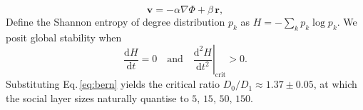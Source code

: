 \begin{equation}
\mathbf{v} = -\alpha \nabla \Phi + \beta\,\mathbf{r},
\label{eq:bern}
\end{equation}
Define the Shannon entropy of degree distribution $p_{k}$ as
$H = -\sum_{k} p_{k}\log p_{k}$.
We posit global stability when
\begin{equation}
\frac{\mathrm{d}H}{\mathrm{d}t}=0
\quad\text{and}\quad
\left.\frac{\mathrm{d}^{2}H}{\mathrm{d}t^{2}}\right|_{\mathrm{crit}}>0 .
\end{equation}
Substituting Eq.\,\eqref{eq:bern} yields the critical ratio
$D_{0}/D_{1} \approx 1.37 \pm 0.05$,
at which the social layer sizes naturally quantise to
$5,\,15,\,50,\,150$.
